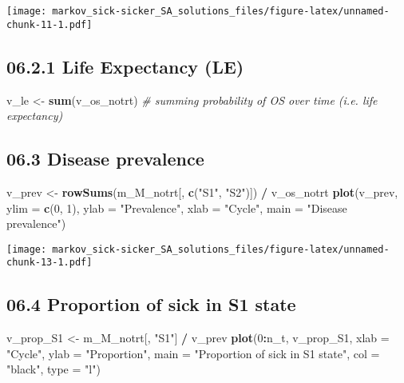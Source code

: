 \documentclass[
]{article}
\newenvironment{Shaded}{\begin{snugshade}}{\end{snugshade}}
\newcommand{\CommentTok}[1]{\textcolor[rgb]{0.56,0.35,0.01}{\textit{#1}}}
\newcommand{\DataTypeTok}[1]{\textcolor[rgb]{0.13,0.29,0.53}{#1}}
\newcommand{\DecValTok}[1]{\textcolor[rgb]{0.00,0.00,0.81}{#1}}
\newcommand{\KeywordTok}[1]{\textcolor[rgb]{0.13,0.29,0.53}{\textbf{#1}}}
\newcommand{\NormalTok}[1]{#1}
\newcommand{\OperatorTok}[1]{\textcolor[rgb]{0.81,0.36,0.00}{\textbf{#1}}}
\newcommand{\StringTok}[1]{\textcolor[rgb]{0.31,0.60,0.02}{#1}}
\begin{document}
\texttt{[image: markov\_sick-sicker\_SA\_solutions\_files/figure-latex/unnamed-chunk-11-1.pdf]}

\hypertarget{life-expectancy-le}{%
\subsection{06.2.1 Life Expectancy (LE)}\label{life-expectancy-le}}

\begin{Shaded}
\begin{Highlighting}[]
\NormalTok{v_le <-}\StringTok{ }\KeywordTok{sum}\NormalTok{(v_os_notrt)  }\CommentTok{# summing probability of OS over time  (i.e. life expectancy)}
\end{Highlighting}
\end{Shaded}

\hypertarget{disease-prevalence}{%
\subsection{06.3 Disease prevalence}\label{disease-prevalence}}

\begin{Shaded}
\begin{Highlighting}[]
\NormalTok{v_prev <-}\StringTok{ }\KeywordTok{rowSums}\NormalTok{(m_M_notrt[, }\KeywordTok{c}\NormalTok{(}\StringTok{"S1"}\NormalTok{, }\StringTok{"S2"}\NormalTok{)]) }\OperatorTok{/}\StringTok{ }\NormalTok{v_os_notrt}
\KeywordTok{plot}\NormalTok{(v_prev,}
     \DataTypeTok{ylim =} \KeywordTok{c}\NormalTok{(}\DecValTok{0}\NormalTok{, }\DecValTok{1}\NormalTok{),}
     \DataTypeTok{ylab =} \StringTok{"Prevalence"}\NormalTok{,}
     \DataTypeTok{xlab =} \StringTok{"Cycle"}\NormalTok{,}
     \DataTypeTok{main =} \StringTok{"Disease prevalence"}\NormalTok{)}
\end{Highlighting}
\end{Shaded}

\texttt{[image: markov\_sick-sicker\_SA\_solutions\_files/figure-latex/unnamed-chunk-13-1.pdf]}

\hypertarget{proportion-of-sick-in-s1-state}{%
\subsection{06.4 Proportion of sick in S1
state}\label{proportion-of-sick-in-s1-state}}

\begin{Shaded}
\begin{Highlighting}[]
\NormalTok{v_prop_S1 <-}\StringTok{ }\NormalTok{m_M_notrt[, }\StringTok{"S1"}\NormalTok{] }\OperatorTok{/}\StringTok{ }\NormalTok{v_prev}
\KeywordTok{plot}\NormalTok{(}\DecValTok{0}\OperatorTok{:}\NormalTok{n_t, v_prop_S1,}
     \DataTypeTok{xlab =} \StringTok{"Cycle"}\NormalTok{, }
     \DataTypeTok{ylab =} \StringTok{"Proportion"}\NormalTok{, }
     \DataTypeTok{main =} \StringTok{"Proportion of sick in S1 state"}\NormalTok{, }
     \DataTypeTok{col  =} \StringTok{"black"}\NormalTok{, }\DataTypeTok{type =} \StringTok{"l"}\NormalTok{)}
\end{Highlighting}
\end{Shaded}
\end{document}
